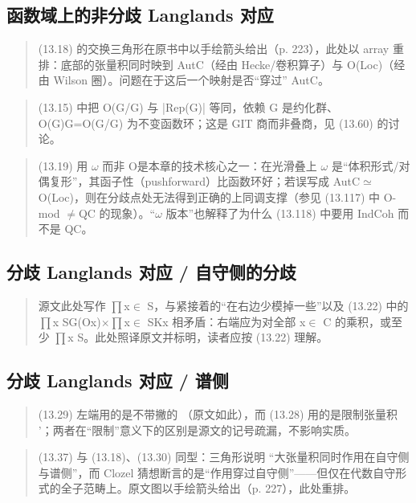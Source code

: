 \subsection*{函数域上的非分歧 Langlands 对应}
\begin{quote}\small
(13.18) 的交换三角形在原书中以手绘箭头给出（p. 223），此处以 array 重排：底部的张量积同时映到 AutC（经由 Hecke/卷积算子）与 O(Loc)（经由 Wilson 圈）。问题在于这后一个映射是否“穿过” AutC。
\end{quote}

\begin{quote}\small
(13.15) 中把 O(G/G) 与 |Rep(G)| 等同，依赖 G 是约化群、O(G)G=O(G/G) 为不变函数环；这是 GIT 商而非叠商，见 (13.60) 的讨论。
\end{quote}

\begin{quote}\small
(13.19) 用 $\omega$ 而非 O是本章的技术核心之一：在光滑叠上 $\omega$ 是“体积形式/对偶复形”，其函子性（pushforward）比函数环好；若误写成 AutC$\simeq$O(Loc)，则在分歧点处无法得到正确的上同调支撑（参见 (13.117) 中 O-mod $\neq$QC 的现象）。“$\omega$ 版本”也解释了为什么 (13.118) 中要用 IndCoh 而不是 QC。
\end{quote}

\subsection*{分歧 Langlands 对应 / 自守侧的分歧}
\begin{quote}\small
源文此处写作 $\prod$x$\in$ S，与紧接着的“在右边少模掉一些”以及 (13.22) 中的 $\prod$x SG(Ox)$\times$$\prod$x$\in$ SKx 相矛盾：右端应为对全部 x$\in$ C 的乘积，或至少 $\prod$x S。此处照译原文并标明，读者应按 (13.22) 理解。
\end{quote}

\subsection*{分歧 Langlands 对应 / 谱侧}
\begin{quote}\small
(13.29) 左端用的是不带撇的 （原文如此），而 (13.28) 用的是限制张量积 '；两者在“限制”意义下的区别是源文的记号疏漏，不影响实质。
\end{quote}

\begin{quote}\small
(13.37) 与 (13.18)、(13.30) 同型：三角形说明 “大张量积同时作用在自守侧与谱侧”，而 Clozel 猜想断言的是“作用穿过自守侧”——但仅在代数自守形式的全子范畴上。原文图以手绘箭头给出（p. 227），此处重排。
\end{quote}

